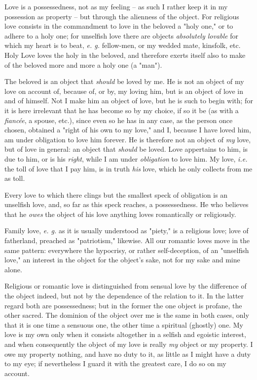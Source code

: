 Love is a possessedness, not as my feeling -- as such I rather keep it in my 
possession as property -- but through the alienness of the object. For 
religious love consists in the commandment to love in the beloved a "{}holy 
one,"{} or to adhere to a holy one; for unselfish love there are objects 
\textit{absolutely lovable} for which my heart is to beat, \textit{e. g.} 
fellow-men, or my wedded mate, kinsfolk, etc. Holy Love loves the holy in the 
beloved, and therefore exerts itself also to make of the beloved more and more 
a holy one (a "{}man"{}).

The beloved is an object that \textit{should} be loved by me. He is not an 
object of my love on account of, because of, or by, my loving him, but is an 
object of love in and of himself. Not I make him an object of love, but he is 
such to begin with; for it is here irrelevant that he has become so by my 
choice, if so it be (as with a \textit{fianc\'ee}, a spouse, etc.), since even 
so he has in any case, as the person once chosen, obtained a "{}right of his 
own to my love,"{} and I, because I have loved him, am under obligation to 
love him forever. He is therefore not an object of \textit{my} love, but of 
love in general: an object that \textit{should} be loved. Love appertains to 
him, is due to him, or is his \textit{right}, while I am under 
\textit{obligation} to love him. My love, \textit{i.e.} the toll of love that 
I pay him, is in truth \textit{his} love, which he only collects from me as 
toll.

Every love to which there clings but the smallest speck of obligation is an 
unselfish love, and, so far as this speck reaches, a possessedness. He who 
believes that he \textit{owes} the object of his love anything loves 
romantically or religiously.

Family love, \textit{e. g.} as it is usually understood as "{}piety,"{} is a 
religious love; love of fatherland, preached as "{}patriotism,"{} likewise. 
All our romantic loves move in the same pattern: everywhere the hypocrisy, or 
rather self-deception, of an "{}unselfish love,"{} an interest in the object 
for the object's sake, not for my sake and mine alone.

Religious or romantic love is distinguished from sensual love by the 
difference of the object indeed, but not by the dependence of the relation to 
it. In the latter regard both are possessedness; but in the former the one 
object is profane, the other sacred. The dominion of the object over me is the 
same in both cases, only that it is one time a sensuous one, the other time a 
spiritual (ghostly) one. My love is my own only when it consists altogether in 
a selfish and egoistic interest, and when consequently the object of my love 
is really \textit{my} object or my property. I owe my property nothing, and 
have no duty to it, as little as I might have a duty to my eye; if 
nevertheless I guard it with the greatest care, I do so on my account.

